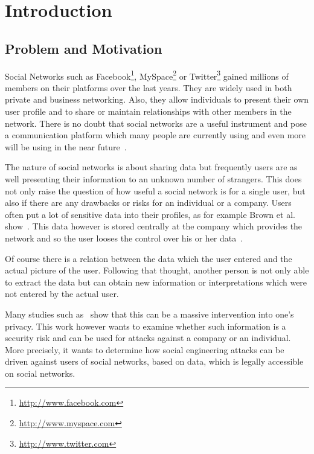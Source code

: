 \chapter{Introduction}
\label{chap:introduction}

\section{Problem and Motivation}

Social Networks such as Facebook\footnote{\url{http://www.facebook.com}},
MySpace\footnote{\url{http://www.myspace.com}} or
Twitter\footnote{\url{http://www.twitter.com}} gained millions of members on
their platforms over the last years. They are widely used in both private and
business networking. Also, they allow individuals to present their own user
profile and to share or maintain relationships with other members in the
network. There is no doubt that social networks are a useful instrument and
pose a communication platform which many people are currently using and even
more will be using in the near future~\cite{whitworth2009}.

The nature of social networks is about sharing data but frequently users are as
well presenting their information to an unknown number of strangers. This does
not only raise the question of how useful a social network is for a single
user, but also if there are any drawbacks or risks for an individual or a
company. Users often put a lot of sensitive data into their
profiles, as for example Brown et al. show~\cite{brown2008}. This data however
is stored centrally at the company which provides the network and so the user
looses the control over his or her data~\cite{fraunhofer2008}.

Of course there is a relation between the data which the user entered and the
actual picture of the user. Following that thought, another person is not only
able to extract the data but can obtain new information or interpretations
which were not entered by the actual user.

Many studies such as~\cite{fraunhofer2008,gross2005} show that this can be a
massive intervention into one's privacy. This work however wants to examine
whether such information is a security risk and can be used for attacks
against a company or an individual. More precisely, it wants to determine how
social engineering attacks can be driven against users of social networks,
based on data, which is legally accessible on social networks.

